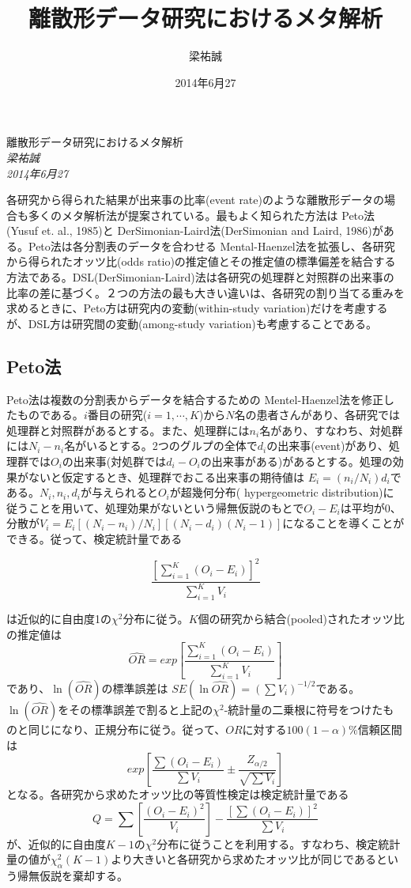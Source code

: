 \documentclass[]{article}
\title{離散形データ研究におけるメタ解析}
\author{梁祐誠}
\date{2014年6月27}
\begin{document}
\begin{center}
\huge 離散形データ研究におけるメタ解析 \\[0.2cm]
\large \emph{梁祐誠}\\[0.1cm]
\large \emph{2014年6月27} \\
\normalsize
\end{center}


{
\hypersetup{linkcolor=black}
\setcounter{tocdepth}{2}
\tableofcontents
}
各研究から得られた結果が出来事の比率(event
rate)のような離散形データの場合も多くのメタ解析法が提案されている。最もよく知られた方法は
Peto法(Yusuf et. al., 1985)と DerSimonian-Laird法(DerSimonian and Laird,
1986)がある。Peto法は各分割表のデータを合わせる
Mental-Haenzel法を拡張し、各研究から得られたオッツ比(odds
ratio)の推定値とその推定値の標準偏差を結合する方法である。DSL(DerSimonian-Laird)法は各研究の処理群と対照群の出来事の比率の差に基づく。２つの方法の最も大きい違いは、各研究の割り当てる重みを求めるときに、Peto方は研究内の変動(within-study
variation)だけを考慮するが、DSL方は研究間の変動(among-study
variation)も考慮することである。

\subsection{Peto法}\label{peto}

Peto法は複数の分割表からデータを結合するための
Mentel-Haenzel法を修正したものである。$i$番目の研究($i = 1, \cdots, K$)から$N$名の患者さんがあり、各研究では処理群と対照群があるとする。また、処理群には$n_i$名があり、すなわち、対処群には$N_i - n_i$名がいるとする。2つのグルプの全体で$d_i$の出来事(event)があり、処理群では$O_i$の出来事(対処群では$d_i - O_i$の出来事がある)があるとする。処理の効果がないと仮定するとき、処理群でおこる出来事の期待値は
$E_i = (n_i/N_i)d_i$である。$N_i, n_i, d_i$が与えられると$O_i$が超幾何分布(
hypergeometric
distribution)に従うことを用いて、処理効果がないという帰無仮説のもとで$O_i - E_i$は平均が0、分散が$V_i = E_i[(N_i - n_i)/N_i][(N_i - d_i)(N_i -1)]$になることを導くことができる。従って、検定統計量である

\[
\frac{\left[ \sum_{i=1}^K (O_i - E_i) \right]^2}{\sum_{i=1}^K V_i}
\]

は近似的に自由度1の$\chi^2$分布に従う。$K$個の研究から結合(pooled)されたオッツ比の推定値は
\[
\widehat{OR} = exp \left[ \frac{\sum_{i=1}^K (O_i - E_i) }{\sum_{i=1}^K V_i} \right]
\] であり、$\ln (\widehat{OR})$の標準誤差は
$SE(\ln \widehat{OR})=\left ( \sum V_i \right )^{-1/2} $である。$\ln (\widehat{OR})$をその標準誤差で割ると上記の$\chi^2$-統計量の二乗根に符号をつけたものと同じになり、正規分布に従う。従って、$OR$に対する$100(1-\alpha)\%$信頼区間は
\[
exp \left [ \frac{\sum(O_i - E_i)}{\sum V_i} \pm \frac{Z_{\alpha/2}}{\sqrt{\sum V_i}} \right ]
\] となる。各研究から求めたオッツ比の等質性検定は検定統計量である \[
Q= \sum \left [ \frac{(O_i-E_i)^2}{V_i} \right ] - \frac{[\sum (O_i - E_i)]^2}{\sum V_i}
\]
が、近似的に自由度$K-1$の$\chi^2$分布に従うことを利用する。すなわち、検定統計量の値が$\chi_{\alpha}^2 (K-1)$より大きいと各研究から求めたオッツ比が同じであるという帰無仮説を棄却する。
\end{document}
